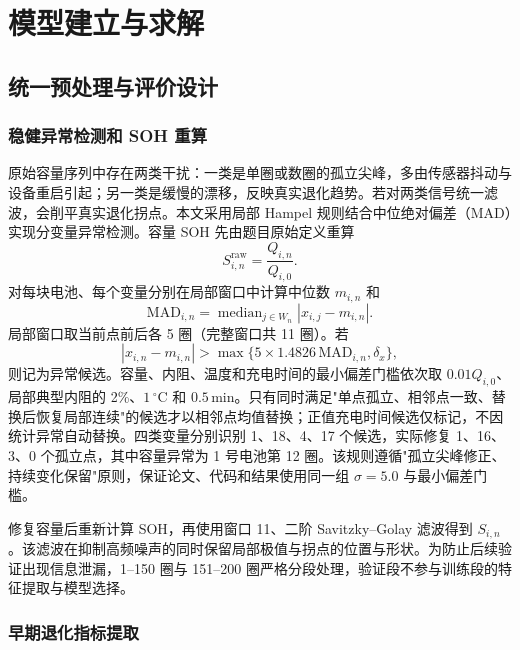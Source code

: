 \documentclass[withoutpreface]{cumcmthesis}
\begin{document}
\section{模型建立与求解}

\subsection{统一预处理与评价设计}

\subsubsection{稳健异常检测和 SOH 重算}

原始容量序列中存在两类干扰：一类是单圈或数圈的孤立尖峰，多由传感器抖动与设备重启引起；另一类是缓慢的漂移，反映真实退化趋势。若对两类信号统一滤波，会削平真实退化拐点。本文采用局部 Hampel 规则结合中位绝对偏差（MAD）实现分变量异常检测\cite{savitzky1964}。容量 SOH 先由题目原始定义重算
\begin{equation}
S_{i,n}^{\mathrm{raw}}=\frac{Q_{i,n}}{Q_{i,0}}.
\end{equation}
对每块电池、每个变量分别在局部窗口中计算中位数 $m_{i,n}$ 和
\begin{equation}
\mathrm{MAD}_{i,n}=\operatorname{median}_{j\in W_n}|x_{i,j}-m_{i,n}|.
\end{equation}
局部窗口取当前点前后各 5 圈（完整窗口共 11 圈）。若
\begin{equation}
|x_{i,n}-m_{i,n}|>
\max\{5\times1.4826\,\mathrm{MAD}_{i,n},\delta_x\},
\end{equation}
则记为异常候选。容量、内阻、温度和充电时间的最小偏差门槛依次取 $0.01Q_{i,0}$、局部典型内阻的 2\%、$1\,^\circ\mathrm C$ 和 $0.5\,\mathrm{min}$。只有同时满足"单点孤立、相邻点一致、替换后恢复局部连续"的候选才以相邻点均值替换；正值充电时间候选仅标记，不因统计异常自动替换。四类变量分别识别 1、18、4、17 个候选，实际修复 1、16、3、0 个孤立点，其中容量异常为 1 号电池第 12 圈。该规则遵循"孤立尖峰修正、持续变化保留"原则，保证论文、代码和结果使用同一组 $\sigma=5.0$ 与最小偏差门槛。

修复容量后重新计算 SOH，再使用窗口 11、二阶 Savitzky--Golay 滤波\cite{savitzky1964}得到 $S_{i,n}$。该滤波在抑制高频噪声的同时保留局部极值与拐点的位置与形状。为防止后续验证出现信息泄漏，1--150 圈与 151--200 圈严格分段处理，验证段不参与训练段的特征提取与模型选择。

\subsubsection{早期退化指标提取}
\end{document}
